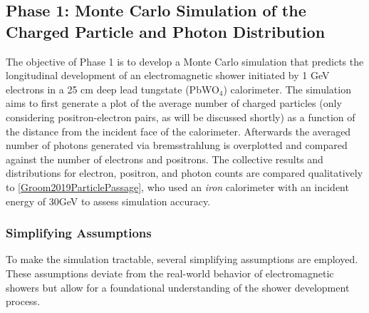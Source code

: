 \documentclass[twocolumn]{aastex631}
\begin{document}
\subsection{Phase 1: Monte Carlo Simulation of the Charged Particle and Photon
Distribution} 

The objective of Phase 1 is to develop a Monte Carlo simulation that predicts
the longitudinal development of an electromagnetic shower initiated by 1 GeV
electrons in a 25 cm deep lead tungstate (PbWO$_\text{4}$) calorimeter. The simulation aims to
first generate a plot of the average number of charged particles (only
considering positron-electron pairs, as will be discussed shortly) as a function
of the distance from the incident face of the calorimeter. Afterwards the
averaged number
of photons generated via bremsstrahlung is overplotted and compared
against the number of electrons and positrons. The collective results and
distributions for electron, positron, and photon counts are compared
qualitatively to \ref{Groom2019ParticlePassage}, who used an \textit{iron}
calorimeter with an incident energy of 30GeV to assess simulation accuracy. 


\subsubsection{Simplifying Assumptions} 

To make the simulation tractable, several simplifying assumptions are employed.
These assumptions deviate from the real-world behavior of electromagnetic
showers but allow for a foundational understanding of the shower development
process. 
\end{document}
